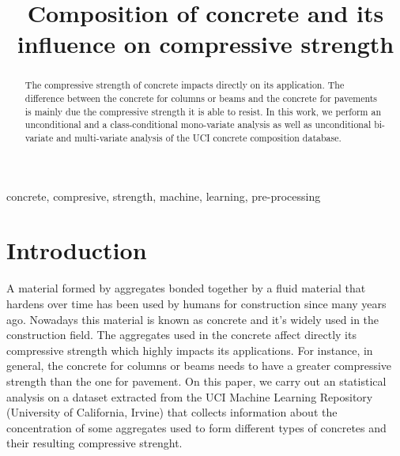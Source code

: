 \documentclass[conference]{IEEEtran}
\begin{document}
\title{Composition of concrete and its influence on compressive strength\\
}

\author{
\and
{}
}

\maketitle

\begin{abstract}
The compressive strength of concrete impacts directly on its application. The difference between the concrete for columns or beams and the concrete for pavements is mainly due the compressive strength it is able to resist. In this work, we perform an unconditional and a class-conditional mono-variate analysis as well as unconditional bi-variate and multi-variate analysis of the UCI concrete composition database.
\end{abstract}

\begin{IEEEkeywords}
concrete, compresive, strength, machine, learning, pre-processing
\end{IEEEkeywords}

\section{Introduction}
A material formed by aggregates bonded together by a fluid material that hardens over time has been used by humans for construction since many years ago\cite{b3}. Nowadays this material is known as concrete and it's widely used in the construction field. The aggregates used in the concrete affect directly its compressive strength which highly impacts its applications. For instance, in general, the concrete for columns or beams needs to have a greater compressive strength than the one for pavement. On this paper, we carry out an statistical analysis on a dataset extracted from the UCI Machine Learning Repository (University of California, Irvine)\cite{b4} that collects information about the concentration of some aggregates used to form different types of concretes and their resulting compressive strenght. 
\end{document}
